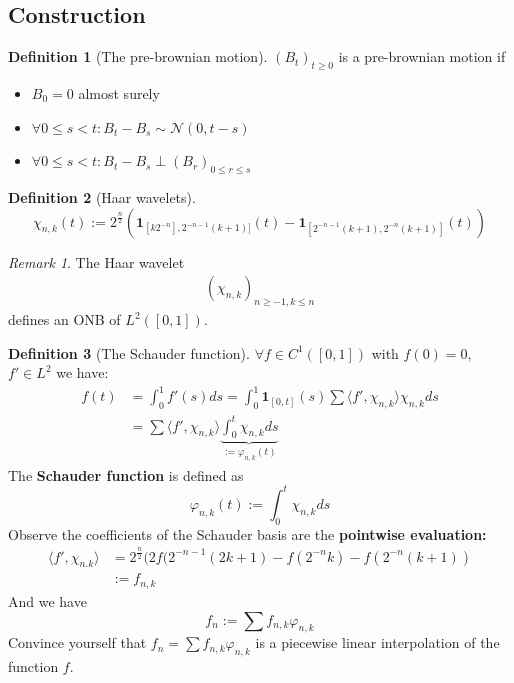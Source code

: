\documentclass[a4paper,11pt]{book}
\theoremstyle{definition}
\newtheorem{definition}{Definition}[section]
\theoremstyle{remark}
\newtheorem*{remark}{Remark}
\begin{document}
\subsection{Construction}
\begin{definition}[The pre-brownian motion]
	$(B_t)_{t \geq 0}$ is a pre-brownian motion if
	\begin{itemize}
		\item $B_0 = 0$ almost surely
		\item $\forall 0 \le s < t: B_t - B_s \sim \mathcal{N}(0, t - s)$
		\item $\forall 0 \le s < t: B_t - B_s \perp (B_r)_{0 \le r \le s}$
	\end{itemize}
\end{definition}

\begin{definition}[Haar wavelets]
	\begin{equation*}
		\chi_{n, k}(t) := 2^{\frac{n}{2}}(\textbf{1}_{[k2^{-n}],2^{-n-1}(k+1)]} (t)- \textbf{1}_{[2^{-n-1}(k+1), 2^{-n}(k+1)]}(t))
	\end{equation*}
\end{definition}
\begin{remark}
The Haar wavelet
\begin{align*}
	(\chi_{n, k})_{ n \ge -1, k \le n}
\end{align*}
defines an ONB of $L^2([0, 1])$. 	
\end{remark}

\begin{definition}[The Schauder function]
$\forall f \in C^1([0, 1])$ with $f(0) = 0$, $f' \in L^2$ we have:
\begin{align*}
	f(t) &= \int_0^1 f'(s)ds = \int_0^1 \textbf{1}_{[0, t]}(s) \sum \langle f', \chi_{n, k} \rangle \chi_{n, k} ds\\
	&= \sum \langle f', \chi_{n, k} \rangle \underbrace{ \int_0^t \chi_{n, k} ds}_{ := \varphi_{n, k}(t)}
\end{align*}
The \textbf{Schauder function} is defined as
\begin{equation*}
	\varphi_{n, k}(t):= \int_0^t \chi_{n, k} ds
\end{equation*}
Observe the coefficients of the Schauder basis are the \textbf{pointwise evaluation:}
\begin{align*}
	\langle f', \chi_{n. k} \rangle &= 2^{\frac{n}{2}} ( 2 f(2^{-n-1}(2k+1) - f(2^{-n}k) - f(2^{-n}(k+1))\\
	 &:= f_{n,k}
\end{align*}
And we have
\begin{equation*}
	f_n:= \sum f_{n, k} \varphi_{n, k}
\end{equation*}
Convince yourself that $f_n = \sum f_{n, k} \varphi_{n, k}$ is a piecewise linear interpolation of the function $f$.
\end{definition}
\end{document}
